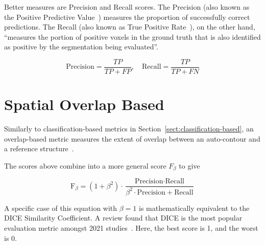 \documentclass[11pt,twoside]{report}
\begin{document}
Better measures are Precision and Recall scores. The Precision (also known as the Positive Predictive Value~\cite{evaluation-metrics}) measures the proportion of successfully correct predictions. The Recall (also known as True Positive Rate~\cite{evaluation-metrics}), on the other hand, ``measures the portion of positive voxels in the ground truth that is also identified as positive by the segmentation being evaluated''.

\begin{equation*}
 \text{Precision} = \frac{TP}{TP+FP}, \quad \text{Recall} = \frac{TP}{TP+FN}
\end{equation*}

\section{Spatial Overlap Based}\label{sect:spatial-overlap-based}

Similarly to classification-based metrics in Section~\ref{sect:classification-based}, an overlap-based metric measures the extent of overlap between an auto-contour and a reference structure~\cite{review-metrics}.

The scores above combine into a more general score $F_\beta$ to give

\begin{equation*}
 \text{F}_\beta = (1+\beta^2)\cdot \frac{\text{Precision} \cdot \text{Recall}}{\beta^2 \cdot \text{Precision}+\text{Recall}}
\end{equation*}

A specific case of this equation with $\beta=1$ is mathematically equivalent to the DICE Similarity Coefficient. A review found that DICE is the most popular evaluation metric amongst 2021 studies~\cite{review-metrics,evaluation-metrics, Sherer2021-le}. Here, the best score is 1, and the worst is 0.

\end{document}
